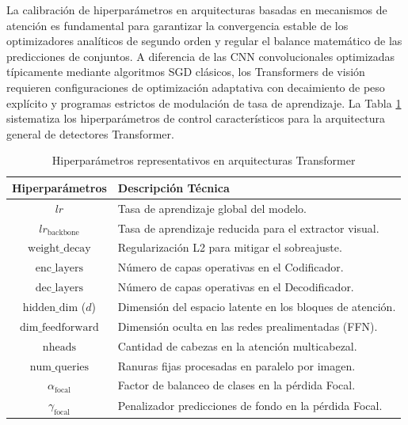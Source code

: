La calibración de hiperparámetros en arquitecturas basadas en mecanismos de atención es fundamental para garantizar la convergencia estable de los optimizadores analíticos de segundo orden y regular el balance matemático de las predicciones de conjuntos. A diferencia de las CNN convolucionales optimizadas típicamente mediante algoritmos SGD clásicos, los Transformers de visión requieren configuraciones de optimización adaptativa con decaimiento de peso explícito y programas estrictos de modulación de tasa de aprendizaje. La Tabla \ref{tab:hiperparametros_transformers} sistematiza los hiperparámetros de control característicos para la arquitectura general de detectores Transformer.\\

\begin{table}[H]
    \centering
    \caption{Hiperparámetros representativos en arquitecturas Transformer}
    \begin{tabular}{|c|l|}
        \hline
        \textbf{Hiperparámetros} & \textbf{Descripción Técnica} \\ 
        \hline
        $lr$ & Tasa de aprendizaje global del modelo. \\ 
        \hline
        $lr_{\text{backbone}}$ & Tasa de aprendizaje reducida para el extractor visual. \\ 
        \hline
        $\text{weight\_decay}$ & Regularización L2 para mitigar el sobreajuste. \\ 
        \hline
        $\text{enc\_layers}$ & Número de capas operativas en el Codificador. \\ 
        \hline
        $\text{dec\_layers}$ & Número de capas operativas en el Decodificador. \\ 
        \hline
        $\text{hidden\_dim}$ ($d$) & Dimensión del espacio latente en los bloques de atención. \\ 
        \hline
        $\text{dim\_feedforward}$ & Dimensión oculta en las redes prealimentadas (FFN). \\ 
        \hline
        $\text{nheads}$ & Cantidad de cabezas en la atención multicabezal. \\ 
        \hline
        $\text{num\_queries}$ & Ranuras fijas procesadas en paralelo por imagen. \\ 
        \hline
        $\alpha_{\text{focal}}$ & Factor de balanceo de clases en la pérdida Focal. \\ 
        \hline
        $\gamma_{\text{focal}}$ & Penalizador predicciones de fondo en la pérdida Focal. \\ 
        \hline
    \end{tabular}
    \label{tab:hiperparametros_transformers}
\end{table}


